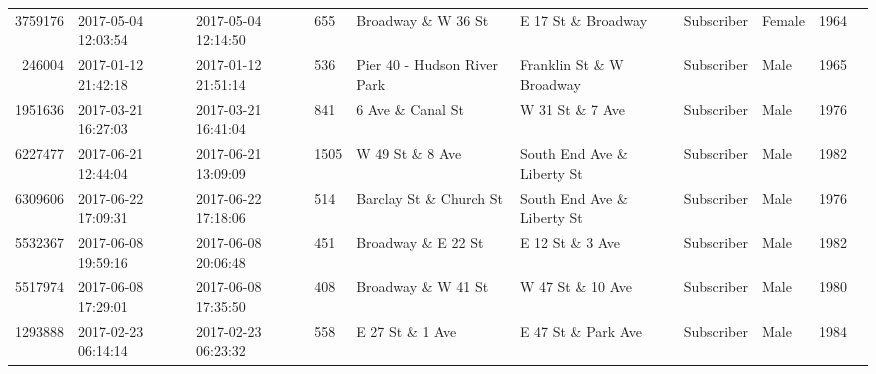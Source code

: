 \documentclass[11pt]{article}
\begin{document}
\begin{description}
\begin{tabular}{r|lllllllll}
	 3759176                       & 2017-05-04 12:03:54           & 2017-05-04 12:14:50           &  655                          & Broadway \& W 36 St          & E 17 St \& Broadway          & Subscriber                    & Female                        & 1964                         \\
	  246004                      & 2017-01-12 21:42:18          & 2017-01-12 21:51:14          &  536                         & Pier 40 - Hudson River Park  & Franklin St \& W Broadway   & Subscriber                   & Male                         & 1965                        \\
	 1951636                       & 2017-03-21 16:27:03           & 2017-03-21 16:41:04           &  841                          & 6 Ave \& Canal St            & W 31 St \& 7 Ave             & Subscriber                    & Male                          & 1976                         \\
	 6227477                       & 2017-06-21 12:44:04           & 2017-06-21 13:09:09           & 1505                          & W 49 St \& 8 Ave             & South End Ave \& Liberty St  & Subscriber                    & Male                          & 1982                         \\
	 6309606                       & 2017-06-22 17:09:31           & 2017-06-22 17:18:06           &  514                          & Barclay St \& Church St      & South End Ave \& Liberty St  & Subscriber                    & Male                          & 1976                         \\
	 5532367                       & 2017-06-08 19:59:16           & 2017-06-08 20:06:48           &  451                          & Broadway \& E 22 St          & E 12 St \& 3 Ave             & Subscriber                    & Male                          & 1982                         \\
	 5517974                       & 2017-06-08 17:29:01           & 2017-06-08 17:35:50           &  408                          & Broadway \& W 41 St          & W 47 St \& 10 Ave            & Subscriber                    & Male                          & 1980                         \\
	 1293888                       & 2017-02-23 06:14:14           & 2017-02-23 06:23:32           &  558                          & E 27 St \& 1 Ave             & E 47 St \& Park Ave          & Subscriber                    & Male                          & 1984                         \\

\end{tabular}
\end{description}
\end{document}
